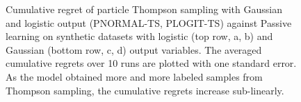 \begin{figure}[t]
	\centering
	\caption{\label{fig:synthetic} Cumulative regret of particle Thompson sampling with Gaussian and logistic output (PNORMAL-TS, PLOGIT-TS) against Passive learning 
	on synthetic datasets with logistic	(top row, a, b) and Gaussian (bottom row, c, d) output variables.
	The averaged cumulative regrets over 10 runs are plotted with one standard error. 
	As the model obtained more and more labeled samples from Thompson sampling, 
	the cumulative regrets increase sub-linearly.}
\end{figure}

